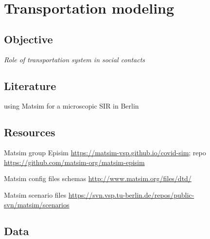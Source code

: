 \documentclass[10pt]{article}
\begin{document}
\cite{adam2020simulating}




\section{Transportation modeling}

\cite{leung2021real}

\subsection{Objective}

\textit{Role of transportation system in social contacts}

\subsection{Literature}

\cite{11303_10945} using Matsim for a microscopic SIR in Berlin

\subsection{Resources}

Matsim group Episim \url{https://matsim-vsp.github.io/covid-sim}; repo \url{https://github.com/matsim-org/matsim-episim}

Matsim config files schemas \url{http://www.matsim.org/files/dtd/}

Matsim scenario files \url{https://svn.vsp.tu-berlin.de/repos/public-svn/matsim/scenarios}
	
\subsection{Data}
\end{document}
